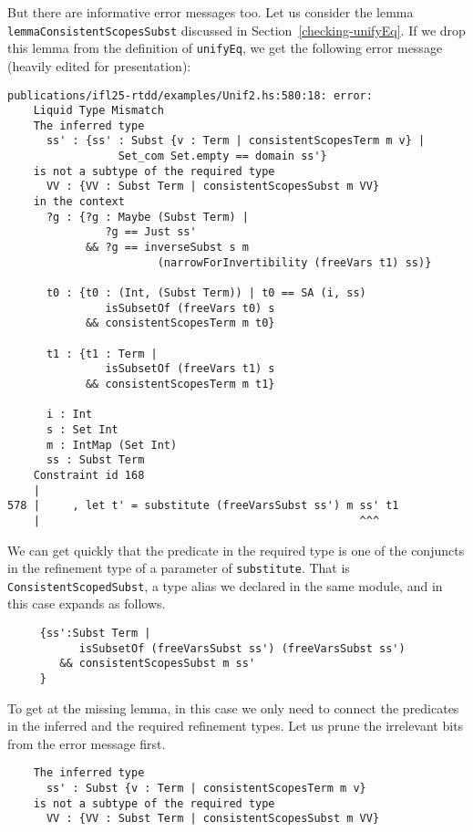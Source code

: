 \documentclass[sigconf, review]{acmart}
\newcommand{\tc}[1]{{\small\texttt{#1}}}
\begin{document}
But there are informative error messages too. Let us consider the lemma \tc{lemma\-Consistent\-Scopes\-Subst} discussed in
Section~\ref{checking-unifyEq}.
If we drop this lemma from the definition of \tc{unifyEq}, we get the following
error message (heavily edited for presentation):
\begin{verbatim}
publications/ifl25-rtdd/examples/Unif2.hs:580:18: error:
    Liquid Type Mismatch
    The inferred type
      ss' : {ss' : Subst {v : Term | consistentScopesTerm m v} |
                 Set_com Set.empty == domain ss'}
    is not a subtype of the required type
      VV : {VV : Subst Term | consistentScopesSubst m VV}
    in the context
      ?g : {?g : Maybe (Subst Term) |
               ?g == Just ss'
            && ?g == inverseSubst s m
                       (narrowForInvertibility (freeVars t1) ss)}

      t0 : {t0 : (Int, (Subst Term)) | t0 == SA (i, ss)
               isSubsetOf (freeVars t0) s
            && consistentScopesTerm m t0}

      t1 : {t1 : Term |
               isSubsetOf (freeVars t1) s
            && consistentScopesTerm m t1}

      i : Int
      s : Set Int
      m : IntMap (Set Int)
      ss : Subst Term
    Constraint id 168
    |
578 |     , let t' = substitute (freeVarsSubst ss') m ss' t1
    |                                                 ^^^
\end{verbatim}

We can get quickly that the predicate in the required type is one of the
conjuncts in the refinement type of
a parameter of \tc{substitute}. That is \tc{ConsistentScopedSubst}, a type alias
we declared in the same module, and in this case expands as follows.

\begin{verbatim}
     {ss':Subst Term |
           isSubsetOf (freeVarsSubst ss') (freeVarsSubst ss')
        && consistentScopesSubst m ss'
     }
\end{verbatim}

To get at the missing lemma, in this case we only need to connect the predicates
in the inferred and the required refinement types. Let us prune the irrelevant
bits from the error message first.

\begin{verbatim}
    The inferred type
      ss' : Subst {v : Term | consistentScopesTerm m v}
    is not a subtype of the required type
      VV : {VV : Subst Term | consistentScopesSubst m VV}
\end{verbatim}
\end{document}
